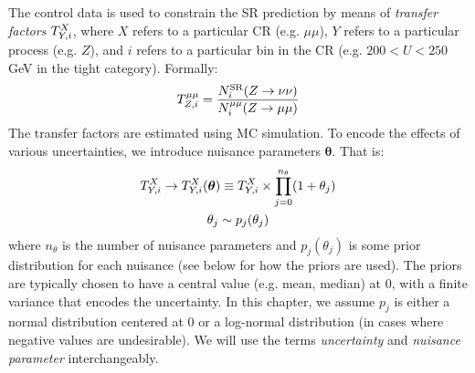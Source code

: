 The control data is used to constrain the SR prediction by means of \emph{transfer factors} ${T}^{X}_{Y,i}$, where $X$ refers to a particular CR (e.g. $\mu\mu$), $Y$ refers to a particular process (e.g. $Z$), and $i$ refers to a particular bin in the CR (e.g. $200<U<250$ GeV in the tight category).
Formally:
\begin{equation}
    {T}^{\mu\mu}_{Z,i} = \frac{N^\mathrm{SR}_i(Z\rightarrow\nu\nu)}{N^{\mu\mu}_i(Z\rightarrow\mu\mu)}
\end{equation}
The transfer factors are estimated using MC simulation.
To encode the effects of various uncertainties, we introduce nuisance parameters $\bm{\theta}$.
That is:
\begin{gather}
    {T}^{X}_{Y,i} \rightarrow {T}^{X}_{Y,i}(\bm\theta) \equiv {T}^{X}_{Y,i} \times \prod_{j=0}^{n_\theta} (1+\theta_j) \\
    \theta_j \sim p_j(\theta_j)
\end{gather}
where $n_\theta$ is the number of nuisance parameters and $p_j(\theta_j)$ is some prior distribution for each nuisance (see below for how the priors are used).
The priors are typically chosen to have a central value (e.g. mean, median) at $0$, with a finite variance that encodes the uncertainty.
In this chapter, we assume $p_j$ is either a normal distribution centered at 0 or a log-normal distribution (in cases where negative values are undesirable).
We will use the terms \emph{uncertainty} and \emph{nuisance parameter} interchangeably.

